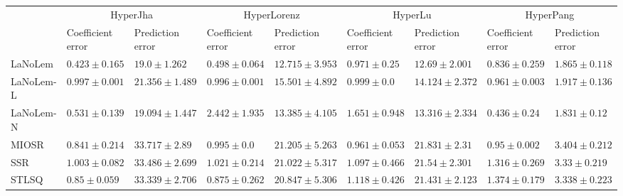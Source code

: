 \begin{table*}
{\begin{tabular}{lllllllll}
 & \multicolumn{2}{c}{HyperJha} & \multicolumn{2}{c}{HyperLorenz} & \multicolumn{2}{c}{HyperLu} & \multicolumn{2}{c}{HyperPang} \\
 & Coefficient error & Prediction error & Coefficient error & Prediction error & Coefficient error & Prediction error & Coefficient error & Prediction error \\
\midrule
LaNoLem & $\mathbf{0.423}\pm 0.165$ & $\mathbf{19.0}\pm 1.262$ & $\mathbf{0.498}\pm 0.064$ & $\mathbf{12.715}\pm 3.953$ & $0.971\pm 0.25$ & $\mathbf{12.69}\pm 2.001$ & $0.836\pm 0.259$ & $1.865\pm 0.118$ \\
LaNoLem-L & $0.997\pm 0.001$ & $21.356\pm 1.489$ & $0.996\pm 0.001$ & $15.501\pm 4.892$ & $0.999\pm 0.0$ & $14.124\pm 2.372$ & $0.961\pm 0.003$ & $1.917\pm 0.136$ \\
LaNoLem-N & $0.531\pm 0.139$ & $19.094\pm 1.447$ & $2.442\pm 1.935$ & $13.385\pm 4.105$ & $1.651\pm 0.948$ & $13.316\pm 2.334$ & $\mathbf{0.436}\pm 0.24$ & $\mathbf{1.831}\pm 0.12$ \\
MIOSR & $0.841\pm 0.214$ & $33.717\pm 2.89$ & $0.995\pm 0.0$ & $21.205\pm 5.263$ & $\mathbf{0.961}\pm 0.053$ & $21.831\pm 2.31$ & $0.95\pm 0.002$ & $3.404\pm 0.212$ \\
SSR & $1.003\pm 0.082$ & $33.486\pm 2.699$ & $1.021\pm 0.214$ & $21.022\pm 5.317$ & $1.097\pm 0.466$ & $21.54\pm 2.301$ & $1.316\pm 0.269$ & $3.33\pm 0.219$ \\
STLSQ & $0.85\pm 0.059$ & $33.339\pm 2.706$ & $0.875\pm 0.262$ & $20.847\pm 5.306$ & $1.118\pm 0.426$ & $21.431\pm 2.123$ & $1.374\pm 0.179$ & $3.338\pm 0.223$ \\

\midrule


\end{tabular}}
\end{table*}
